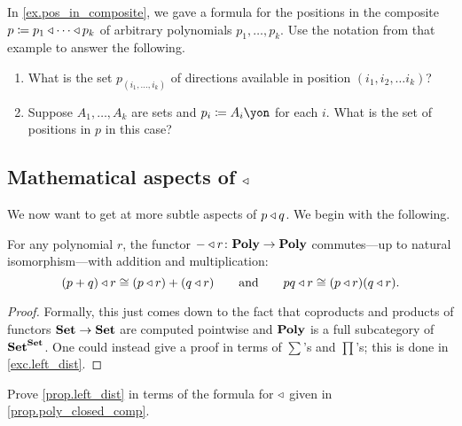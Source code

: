 \documentclass[DynamicalBook]{subfiles}
\begin{document}
\begin{exercise}
In \cref{ex.pos_in_composite}, we gave a formula for the positions in the composite $p\coloneqq p_1\mathbin{\triangleleft}\cdots\mathbin{\triangleleft} p_k$ of arbitrary polynomials $p_1,\ldots,p_k$. Use the notation from that example to answer the following.
\begin{enumerate}
	\item What is the set $p_{(i_1,\ldots,i_k)}$ of directions available in position $(i_1,i_2,\ldots i_k)$?
	\item Suppose $A_1,\ldots,A_k$ are sets and $p_i\coloneqq A_i\yon$ for each $i$. What is the set of positions in $p$ in this case?
\qedhere
\end{enumerate}
\end{exercise}


\subsection{Mathematical aspects of $\mathbin{\triangleleft}$}

We now want to get at more subtle aspects of $p\mathbin{\triangleleft} q$. We begin with the following.

\begin{proposition}\label{prop.left_dist}
For any polynomial $r$, the functor $-\mathbin{\triangleleft} r\colon\textbf{Poly}\to\textbf{Poly}$ commutes---up to natural isomorphism---with addition and multiplication:
\[
  (p+q)\mathbin{\triangleleft} r\cong (p\mathbin{\triangleleft} r)+(q\mathbin{\triangleleft} r)
  \qquad\text{and}\qquad
  pq\mathbin{\triangleleft} r\cong (p\mathbin{\triangleleft} r)(q\mathbin{\triangleleft} r).
\]
\end{proposition} 
\begin{proof}
Formally, this just comes down to the fact that coproducts and products of functors $\textbf{Set}\to\textbf{Set}$ are computed pointwise and $\textbf{Poly}$ is a full subcategory of $\textbf{Set}^{\textbf{Set}}$. One could instead give a proof in terms of $\sum$'s and $\prod$'s; this is done in \cref{exc.left_dist}.
\end{proof}

\begin{exercise}\label{exc.left_dist}
Prove \cref{prop.left_dist} in terms of the formula for $\mathbin{\triangleleft}$ given in \cref{prop.poly_closed_comp}.
\end{exercise}
\end{document}
